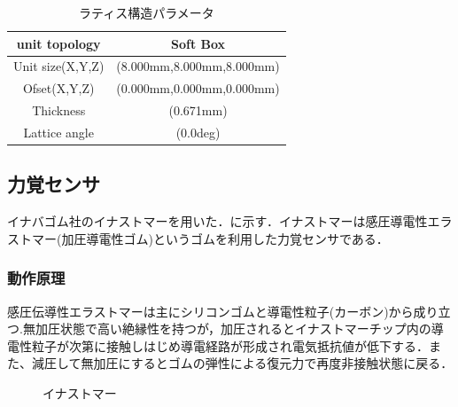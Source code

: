 \begin{table}[htbp]
    \caption{ラティス構造パラメータ} 
  \label{tab::prm}
  \centering
   \begin{tabular}{|c||c|} \hline
      unit topology & Soft Box  \\ \hline
        Unit size(X,Y,Z) & (8.000mm,8.000mm,8.000mm)  \\ \hline
    Ofset(X,Y,Z) & (0.000mm,0.000mm,0.000mm)  \\ \hline		
    Thickness & (0.671mm)  \\ \hline
    Lattice angle & (0.0deg)  \\ \hline	
    \end{tabular}
\end{table}

\newpage


\subsection{力覚センサ}
イナバゴム社のイナストマーを用いた．に示す．イナストマーは感圧導電性エラストマー(加圧導電性ゴム)\cite{kanatsu}というゴムを利用した力覚センサである．

\subsubsection{動作原理}
感圧伝導性エラストマーは主にシリコンゴムと導電性粒子(カーボン)から成り立つ.無加圧状態で高い絶縁性を持つが，加圧されるとイナストマーチップ内の導電性粒子が次第に接触しはじめ導電経路が形成され電気抵抗値が低下する．また、減圧して無加圧にするとゴムの弾性による復元力で再度非接触状態に戻る\cite{inabagomu}．

\begin{figure}[h]
\centering
{}
\hspace{5mm}
\caption{イナストマー}
\label{fig::ina}
\end{figure}

\newpage



